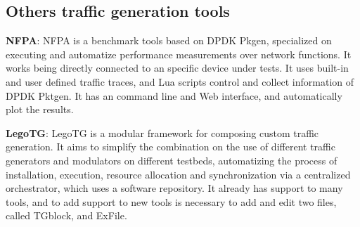 \subsection{Others traffic generation tools}


\textbf{NFPA}\cite{nfpa-paper}: NFPA is a benchmark tools based on DPDK Pkgen, specialized on executing and automatize performance measurements over network functions. It works being directly connected to an specific device under tests. It uses built-in and user defined traffic traces, and Lua scripts control and collect information of DPDK Pktgen. It has an command line and Web interface, and automatically plot the results.

\textbf{LegoTG}\cite{legotg-paper}: LegoTG is a modular framework for composing custom traffic generation. It aims to simplify the combination on the use of different traffic generators and modulators on different testbeds, automatizing the process of installation, execution, resource allocation and synchronization via a centralized orchestrator, which uses a software repository. It already has support to many tools, and to add support to new tools is necessary to add and edit two files, called TGblock, and ExFile.


